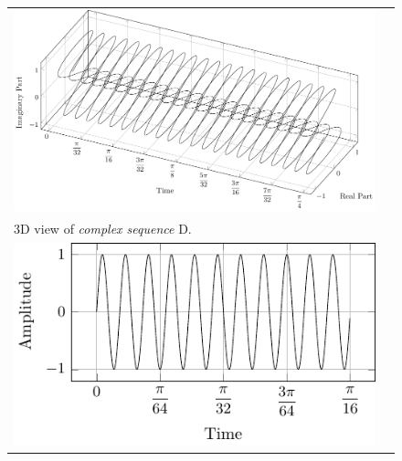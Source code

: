 \documentclass[../../course]{subfiles}
\begin{document}
\begin{figure} [H]

    \renewcommand{\arraystretch}{0.75}
    \centering
    \begin{NiceTabularX} {\textwidth} {
            *{2}{>{\centering\arraybackslash}X}
        }

         {
             {
                \includegraphics[height = \textheight] {tikzpics/plotComplexD.pdf}
            }
        }

        &
        \\

         {
            \vbox{
                 {3D view of \emph{complex sequence} D.}
                \label{plt:cmplxD}
            }
        }

        &
        \\

         {
             {
                \includegraphics[height = \textheight] {tikzpics/plotShortX2.pdf}
            }
        }

        &


\end{NiceTabularX}
\end{figure}
\end{document}
